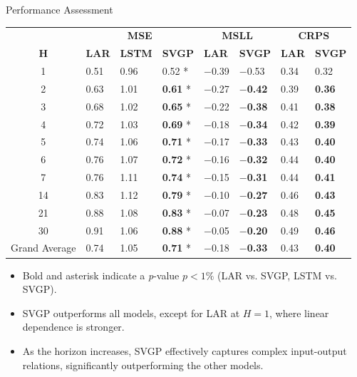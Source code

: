 \begin{frame}{Performance Assessment}


	\begin{table}[htbp]
			\scriptsize
		\begin{tabular}{c p{1cm}p{1.0cm}p{1.0cm}p{1.0cm}p{1.0cm}p{1.0cm}p{1.0cm}}
			\toprule
			& \multicolumn{3}{c}{\textbf{MSE}} & \multicolumn{2}{c}{\textbf{MSLL}} & \multicolumn{2}{c}{\textbf{CRPS}} \\
			\cmidrule{2-8}
			\( \textbf{H} \) & \textbf{LAR} & \textbf{LSTM} & \textbf{SVGP} & \textbf{LAR} & \textbf{SVGP} & \textbf{LAR} & \textbf{SVGP} \\
			\midrule
			1  & 0.51 & 0.96 & 0.52 * & $-$0.39 & $-$0.53 & 0.34 & 0.32 \\
			2  & 0.63 & 1.01 & \textbf{0.61} * & $-$0.27 & \textbf{$-$0.42} & 0.39 & \textbf{0.36} \\
			3  & 0.68 & 1.02 & \textbf{0.65} * & $-$0.22 & \textbf{$-$0.38} & 0.41 & \textbf{0.38} \\
			4  & 0.72 & 1.03 & \textbf{0.69} * & $-$0.18 & \textbf{$-$0.34} & 0.42 & \textbf{0.39} \\
			5  & 0.74 & 1.06 & \textbf{0.71} * & $-$0.17 & \textbf{$-$0.33} & 0.43 & \textbf{0.40} \\
			6  & 0.76 & 1.07 & \textbf{0.72} * & $-$0.16 & \textbf{$-$0.32} & 0.44 & \textbf{0.40} \\
			7  & 0.76 & 1.11 & \textbf{0.74} * & $-$0.15 & \textbf{$-$0.31} & 0.44 & \textbf{0.41} \\
			14 & 0.83 & 1.12 & \textbf{0.79} * & $-$0.10 & \textbf{$-$0.27} & 0.46 & \textbf{0.43} \\
			21 & 0.88 & 1.08 & \textbf{0.83} * & $-$0.07 & \textbf{$-$0.23} & 0.48 & \textbf{0.45} \\
			30 & 0.91 & 1.06 & \textbf{0.88} * & $-$0.05 & \textbf{$-$0.20} & 0.49 & \textbf{0.46} \\
			\midrule
			Grand Average & 0.74 & 1.05 & \textbf{0.71} * & $-$0.18 & \textbf{$-$0.33} & 0.43 & \textbf{0.40} \\
			\bottomrule
		\end{tabular}
	
	\end{table}

	\begin{itemize}
	\item Bold and asterisk indicate a \emph{p}-value \(p < 1\%\) (LAR vs. SVGP, LSTM vs. SVGP).
	\item SVGP outperforms all models, except for LAR at \(H=1\), where linear dependence is stronger.
	\item As the horizon increases, SVGP effectively captures complex input-output relations, significantly outperforming the other models.
\end{itemize}
\end{frame}

